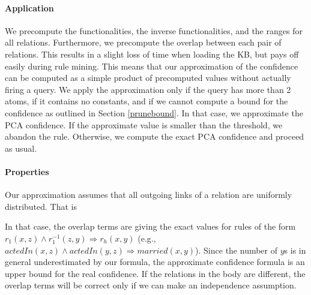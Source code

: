 {
\paragraph{Application} We precompute the functionalities, the inverse functionalities, and the ranges for all relations.
Furthermore, we precompute the overlap between each pair of relations. This results in a slight loss of time when loading the KB, but pays off easily during rule mining.
This means that our approximation of the confidence can be computed as a simple product of precomputed values without actually firing a query.
We apply the approximation only if the query has more than 2 atoms, if it contains no constants, and if we cannot compute a bound for the confidence as outlined in Section \ref{prunebound}.
 In that case, we approximate the PCA confidence. If the approximate value is smaller than the threshold, we abandon the rule. Otherwise, we compute the exact PCA confidence and proceed as usual. 

\paragraph{Properties} Our approximation assumes that all outgoing links of a relation are uniformly distributed. That is 

In that case,
the overlap terms are giving the exact values for rules of the form $r_1(x,z) \wedge r_{1} ^{-1}(z,y)\Rightarrow r_h(x,y)$ (e.g., $actedIn(x,z)\wedge actedIn(y,z)\Rightarrow married(x,y)$). Since the number of $y$s is in general underestimated by our formula, the approximate confidence formula is an upper bound for the real confidence. If the relations in the body are different, the overlap terms will be correct only if we can make an independence assumption. 

}
